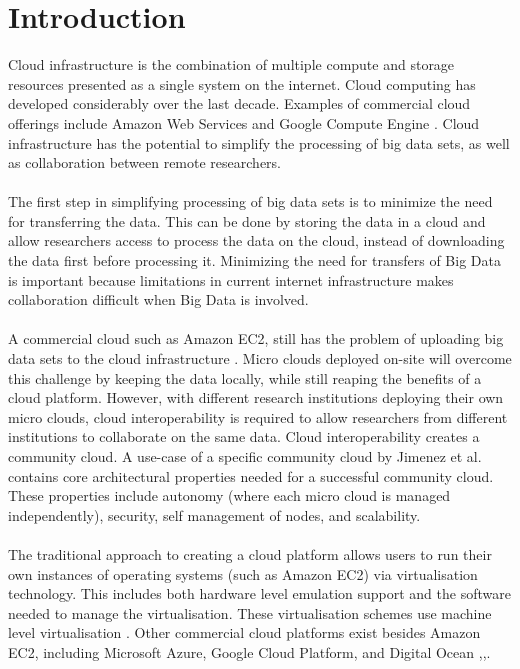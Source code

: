 \documentclass{sig-alternate-05-2015}
\begin{document}
\section{Introduction}
Cloud infrastructure is the combination of multiple compute and storage resources presented as a single system on the internet. Cloud computing has developed considerably over the last decade. Examples of commercial cloud offerings include Amazon Web Services and Google Compute Engine \cite{krishnan2015google, mathew2014overview}. Cloud infrastructure has the potential to simplify the processing of big data sets, as well as collaboration between remote researchers. 
\\
\\
The first step in simplifying processing of big data sets is to minimize the need for transferring the data. This can be done by storing the data in a cloud and allow researchers access to process the data on the cloud, instead of downloading the data first before processing it. Minimizing the need for transfers of Big Data is important because limitations in current internet infrastructure makes collaboration difficult when Big Data is involved. 
\\
\\
A commercial cloud such as Amazon EC2, still has the problem of uploading big data sets to the cloud infrastructure \cite{baker2010next}. Micro clouds deployed on-site will overcome this challenge by keeping the data locally, while still reaping the benefits of a cloud platform. However, with different research institutions deploying their own micro clouds, cloud interoperability is required to allow researchers from different institutions to collaborate on the same data. Cloud interoperability creates a community cloud. A use-case of a specific community cloud  by Jimenez et al. \cite{jimenez2014deploying} contains core architectural properties needed for a successful community cloud. These properties include autonomy (where each micro cloud is managed independently), security, self management of nodes, and scalability.
\\
\\
The traditional approach to creating a cloud platform allows users to run their own instances of operating systems (such as Amazon EC2) via virtualisation technology. This includes both hardware level emulation support and the software needed to manage the virtualisation. These virtualisation schemes use machine level virtualisation \cite{fink2014docker}. Other commercial cloud platforms exist besides Amazon EC2, including Microsoft Azure, Google Cloud Platform, and Digital Ocean \cite{gannon2014science},\cite{googlecompute},\cite{digitalocean}.
\end{document}
